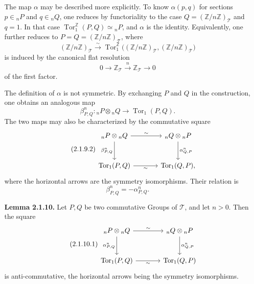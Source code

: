 \documentclass[11pt]{article}
\providecommand{\Torop}{\operatorname{Tor}}
\providecommand{\cT}{\mathcal T}
\begin{document}
The map \(\alpha\) may be described more explicitly.  To know \(\alpha(p,q)\) for sections \(p\in{}_nP\) and \(q\in{}_nQ\), one reduces by functoriality to the case \(Q=(\mathbb Z/n\mathbb Z)_\cT\) and \(q=1\).  In that case \(\Torop_1^{\mathbb Z}(P,Q)\simeq{}_nP\), and \(\alpha\) is the identity.  Equivalently, one further reduces to \(P=Q=(\mathbb Z/n\mathbb Z)_\cT\), where
\begin{equation}\tag{2.1.8.1}
        (\mathbb Z/n\mathbb Z)_\cT
        \xrightarrow{\sim}\Torop_1^{\mathbb Z}\bigl((\mathbb Z/n\mathbb Z)_\cT,(\mathbb Z/n\mathbb Z)_\cT\bigr)
\end{equation}
is induced by the canonical flat resolution
\begin{equation}\tag{2.1.8.2}
        0\longrightarrow\mathbb Z_\cT\xrightarrow{n}\mathbb Z_\cT\longrightarrow0
\end{equation}
of the first factor.

The definition of \(\alpha\) is not symmetric.  By exchanging \(P\) and \(Q\) in the construction, one obtains an analogous map
\begin{equation}\tag{2.1.9.1}
        \beta^n_{P,Q}:{}_nP\otimes{}_nQ\longrightarrow\Torop_1(P,Q).
\end{equation}
The two maps may also be characterized by the commutative square
\begin{equation}\tag{2.1.9.2}
\begin{tikzcd}[column sep=large,row sep=large]
{}_nP\otimes{}_nQ \arrow[r,"\sim"] \arrow[d,"\beta^n_{P,Q}"']
  & {}_nQ\otimes{}_nP \arrow[d,"\alpha^n_{Q,P}"]\\
\Torop_1(P,Q) \arrow[r,"\sim"'] & \Torop_1(Q,P),
\end{tikzcd}
\end{equation}
where the horizontal arrows are the symmetry isomorphisms.  Their relation is
\begin{equation}\tag{2.1.9.3}
        \beta^n_{P,Q}=-\alpha^n_{P,Q}.
\end{equation}

\textbf{Lemma 2.1.10.}  Let \(P,Q\) be two commutative Groups of \(\cT\), and let \(n>0\).  Then the square
\begin{equation}\tag{2.1.10.1}
\begin{tikzcd}[column sep=large,row sep=large]
{}_nP\otimes{}_nQ \arrow[r,"\sim"] \arrow[d,"\alpha^n_{P,Q}"']
  & {}_nQ\otimes{}_nP \arrow[d,"\alpha^n_{Q,P}"]\\
\Torop_1(P,Q) \arrow[r,"\sim"'] & \Torop_1(Q,P)
\end{tikzcd}
\end{equation}
is anti-commutative, the horizontal arrows being the symmetry isomorphisms.
\end{document}

